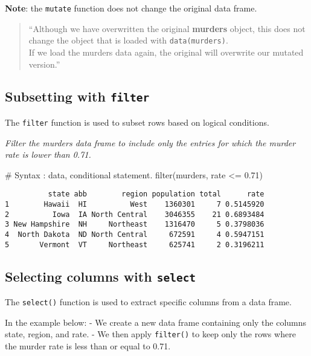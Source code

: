 \documentclass[
  letterpaper,
  DIV=11,
  numbers=noendperiod]{scrreprt}
\newenvironment{Shaded}{\begin{snugshade}}{\end{snugshade}}
\newcommand{\CommentTok}[1]{\textcolor[rgb]{0.37,0.37,0.37}{#1}}
\newcommand{\FloatTok}[1]{\textcolor[rgb]{0.68,0.00,0.00}{#1}}
\newcommand{\FunctionTok}[1]{\textcolor[rgb]{0.28,0.35,0.67}{#1}}
\newcommand{\NormalTok}[1]{\textcolor[rgb]{0.00,0.23,0.31}{#1}}
\newcommand{\SpecialCharTok}[1]{\textcolor[rgb]{0.37,0.37,0.37}{#1}}
\begin{document}
\textbf{Note}: the \texttt{mutate} function does not change the original
data frame.

\begin{quote}
``Although we have overwritten the original \textbf{murders} object,
this does not change the object that is loaded with
\texttt{data(murders)}.\\
If we load the murders data again, the original will overwrite our
mutated version.''
\end{quote}

\subsection{\texorpdfstring{Subsetting with
\texttt{filter}}{Subsetting with filter}}\label{subsetting-with-filter}

The \texttt{filter} function is used to subset rows based on logical
conditions.

\emph{Filter the murders data frame to include only the entries for
which the murder rate is lower than 0.71.}

\begin{Shaded}
\begin{Highlighting}[]
\CommentTok{\# Syntax : data, conditional statement.}
\FunctionTok{filter}\NormalTok{(murders, rate }\SpecialCharTok{\textless{}=} \FloatTok{0.71}\NormalTok{)}
\end{Highlighting}
\end{Shaded}

\begin{verbatim}
          state abb        region population total      rate
1        Hawaii  HI          West    1360301     7 0.5145920
2          Iowa  IA North Central    3046355    21 0.6893484
3 New Hampshire  NH     Northeast    1316470     5 0.3798036
4  North Dakota  ND North Central     672591     4 0.5947151
5       Vermont  VT     Northeast     625741     2 0.3196211
\end{verbatim}

\subsection{\texorpdfstring{Selecting columns with
\texttt{select}}{Selecting columns with select}}\label{selecting-columns-with-select}

The \texttt{select()} function is used to extract specific columns from
a data frame.

In the example below: - We create a new data frame containing only the
columns state, region, and rate. - We then apply \texttt{filter()} to
keep only the rows where the murder rate is less than or equal to 0.71.
\end{document}
